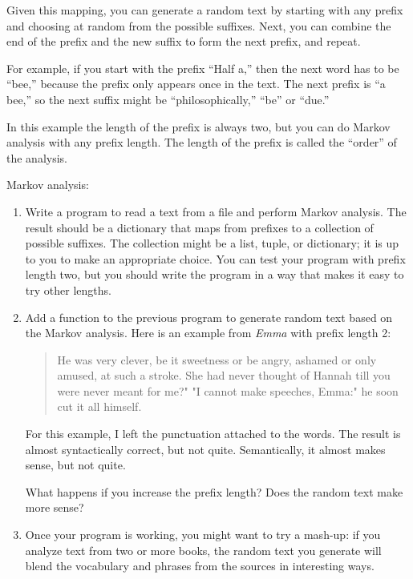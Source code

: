 \documentclass[10pt]{book}
\begin{document}
Given this mapping, you can generate a random text by
starting with any prefix and choosing at random from the
possible suffixes.  Next, you can combine the end of the
prefix and the new suffix to form the next prefix, and repeat.

For example, if you start with the prefix ``Half a,'' then the
next word has to be ``bee,'' because the prefix only appears
once in the text.  The next prefix is ``a bee,'' so the
next suffix might be ``philosophically,'' ``be'' or ``due.''

In this example the length of the prefix is always two, but
you can do Markov analysis with any prefix length.  The length
of the prefix is called the ``order'' of the analysis.

\begin{ex}
Markov analysis:

\begin{enumerate}

\item Write a program to read a text from a file and perform Markov
analysis.  The result should be a dictionary that maps from
prefixes to a collection of possible suffixes.  The collection
might be a list, tuple, or dictionary; it is up to you to make
an appropriate choice.  You can test your program with prefix
length two, but you should write the program in a way that makes
it easy to try other lengths.

\item Add a function to the previous program to generate random text
based on the Markov analysis.  Here is an example from {\em Emma}
with prefix length 2:

\begin{quote}
He was very clever, be it sweetness or be angry, ashamed or only
amused, at such a stroke. She had never thought of Hannah till you
were never meant for me?" "I cannot make speeches, Emma:" he soon cut
it all himself.
\end{quote}

For this example, I left the punctuation attached to the words.
The result is almost syntactically correct, but not quite.
Semantically, it almost makes sense, but not quite.

What happens if you increase the prefix length?  Does the random
text make more sense?


\item Once your program is working, you might want to try a mash-up:
if you analyze text from two or more books, the random
text you generate will blend the vocabulary and phrases from
the sources in interesting ways.

\end{enumerate}
\end{ex}
\end{document}

